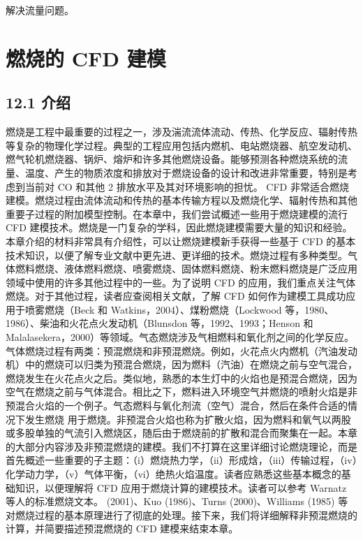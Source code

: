\documentclass[11pt,a4paper,openany,fontset=none]{ctexbook}
\begin{document}
解决流量问题。

\chapter{燃烧的 CFD 建模}

\section*{12.1 介绍}

燃烧是工程中最重要的过程之一，涉及湍流流体流动、传热、化学反应、辐射传热等复杂的物理化学过程。典型的工程应用包括内燃机、电站燃烧器、航空发动机、燃气轮机燃烧器、锅炉、熔炉和许多其他燃烧设备。能够预测各种燃烧系统的流量、温度、产生的物质浓度和排放对于燃烧设备的设计和改进非常重要，特别是考虑到当前对 CO 和其他 2 排放水平及其对环境影响的担忧。 CFD 非常适合燃烧建模。燃烧过程由流体流动和传热的基本传输方程以及燃烧化学、辐射传热和其他重要子过程的附加模型控制。在本章中，我们尝试概述一些用于燃烧建模的流行 CFD 建模技术。燃烧是一门复杂的学科，因此燃烧建模需要大量的知识和经验。本章介绍的材料非常具有介绍性，可以让燃烧建模新手获得一些基于 CFD 的基本技术知识，以便了解专业文献中更先进、更详细的技术。燃烧过程有多种类型。气体燃料燃烧、液体燃料燃烧、喷雾燃烧、固体燃料燃烧、粉末燃料燃烧是广泛应用领域中使用的许多其他过程中的一些。为了说明 CFD 的应用，我们重点关注气体燃烧。对于其他过程，读者应查阅相关文献，了解 CFD 如何作为建模工具成功应用于喷雾燃烧（Beck 和 Watkins，2004）、煤粉燃烧（Lockwood 等，1980、1986）、柴油和火花点火发动机（Blunsdon 等，1992、1993；Henson 和 Malalasekera，2000）等领域。气态燃烧涉及气相燃料和氧化剂之间的化学反应。气体燃烧过程有两类：预混燃烧和非预混燃烧。例如，火花点火内燃机（汽油发动机）中的燃烧可以归类为预混合燃烧，因为燃料（汽油）在燃烧之前与空气混合，燃烧发生在火花点火之后。类似地，熟悉的本生灯中的火焰也是预混合燃烧，因为空气在燃烧之前与气体混合。相比之下，燃料进入环境空气并燃烧的喷射火焰是非预混合火焰的一个例子。气态燃料与氧化剂流（空气）混合，然后在条件合适的情况下发生燃烧
用于燃烧。非预混合火焰也称为扩散火焰，因为燃料和氧气以两股或多股单独的气流引入燃烧区，随后由于燃烧前的扩散和混合而聚集在一起。本章的大部分内容涉及非预混燃烧的建模。我们不打算在这里详细讨论燃烧理论，而是首先概述一些重要的子主题：（i）燃烧热力学，（ii）形成焓，（iii）传输过程，（iv）化学动力学，（v）气体平衡，（vi）绝热火焰温度。读者应熟悉这些基本概念的基础知识，以便理解将 CFD 应用于燃烧计算的建模技术。读者可以参考 Warnatz 等人的标准燃烧文本。 (2001)、Kuo (1986)、Turns (2000)、Williams (1985) 等对燃烧过程的基本原理进行了彻底的处理。接下来，我们将详细解释非预混燃烧的计算，并简要描述预混燃烧的 CFD 建模来结束本章。
\end{document}
